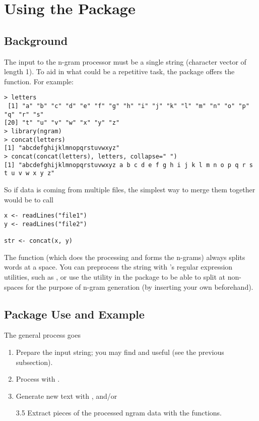 \section{Using the Package}


\subsection{Background}

The input to the n-gram processor must be a single string (character vector of length 
1).  To aid in what could be a repetitive task, the package offers 
the  function.  For example:

\begin{lstlisting}[language=inteRactive]
> letters
 [1] "a" "b" "c" "d" "e" "f" "g" "h" "i" "j" "k" "l" "m" "n" "o" "p" "q" "r" "s"
[20] "t" "u" "v" "w" "x" "y" "z"
> library(ngram)
> concat(letters)
[1] "abcdefghijklmnopqrstuvwxyz"
> concat(concat(letters), letters, collapse=" ")
[1] "abcdefghijklmnopqrstuvwxyz a b c d e f g h i j k l m n o p q r s t u v w x y z"
\end{lstlisting}

So if data is coming from multiple files, the simplest way to merge them 
together would be to call

\begin{lstlisting}[language=rr]
x <- readLines("file1")
y <- readLines("file2")

str <- concat(x, y)
\end{lstlisting}

The  function (which does the processing and forms the n-grams) always splits words 
at a 
space. You can preprocess the string with \R's regular expression 
utilities, such as , or use the  utility in 
the \thispackage package to be able to split at non-spaces for the purpose of n-gram generation (by 
inserting your own beforehand).



\subsection{Package Use and Example}

The general process goes
\begin{enumerate}
  \item Prepare the input string; you may find  and 
 useful (see the previous subsection).
  \item Process with .
  \item Generate new text with , and/or
  \item[3.5] Extract pieces of the processed ngram data with the  
functions.
\end{enumerate}




